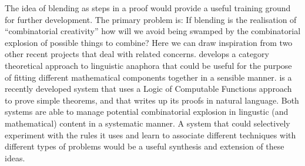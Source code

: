 The idea of blending as steps in a proof would provide a useful
training ground for further development.  The primary problem is: If
blending is the realisation of ``combinatorial creativity'' how will
we avoid being swamped by the combinatorial explosion of possible
things to combine?
%
Here we can draw inspiration from two other recent projects that deal with
related concerns.
\cite{AbrSad14} develops a category theoretical approach to linguistic
anaphora that could be useful for the purpose of fitting different
mathematical components together in a sensible manner.
\cite{DBLP:journals/corr/GanesalingamG13} is a recently developed
system that uses a Logic of Computable Functions approach to prove
simple theorems, and that writes up its proofs in natural language.
%
Both systems are able to manage potential combinatorial explosion
in lingustic (and mathematical) content in a systematic manner.
%
A system that could selectively experiment with the rules it uses and
learn to associate different techniques with different types of
problems would be a useful synthesis and extension of these ideas.

